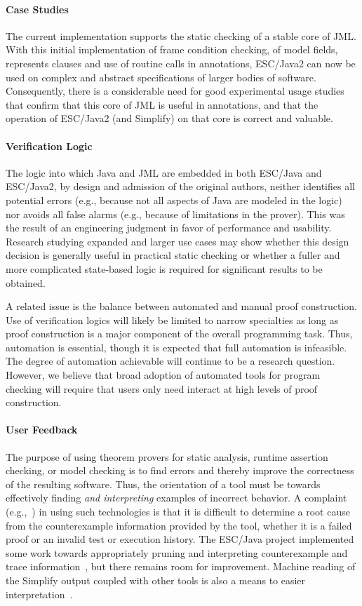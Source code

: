 \documentclass{llncs}
\begin{document}
\paragraph*{Case Studies} The current implementation supports the
static checking of a stable core of JML.  With this initial
implementation of frame condition checking, of model fields,
represents clauses and use of routine calls in annotations, ESC/Java2
can now be used on complex and abstract specifications of larger
bodies of software.  Consequently, there is a considerable need for
good experimental usage studies that confirm that this core of JML is
useful in annotations, and that the operation of ESC/Java2 (and
Simplify) on that core is correct and valuable.

\paragraph*{Verification Logic} The logic into which Java and JML are
embedded in both ESC/Java and ESC/Java2, by design and admission of
the original authors, neither identifies all potential errors (e.g.,
because not all aspects of Java are modeled in the logic) nor avoids
all false alarms (e.g., because of limitations in the prover).  This
was the result of an engineering judgment in favor of performance and
usability.  Research studying expanded and larger use cases may show
whether this design decision is generally useful in practical static
checking or whether a fuller and more complicated state-based logic is
required for significant results to be obtained.

A related issue is the balance between automated and manual proof
construction.  Use of verification logics will likely be limited to
narrow specialties as long as proof construction is a major component
of the overall programming task.  Thus, automation is essential,
though it is expected that full automation is infeasible.  The degree
of automation achievable will continue to be a research question.
However, we believe that broad adoption of automated tools for program
checking will require that users only need interact at high levels of
proof construction.

\paragraph*{User Feedback} The purpose of using theorem provers for
static analysis, runtime assertion checking, or model checking is to
find errors and thereby improve the correctness of the resulting
software.  Thus, the orientation of a tool must be towards effectively
finding \emph{and interpreting} examples of incorrect behavior.  A
complaint (e.g.,~\cite{GroceVisser03}) in using such technologies is
that it is difficult to determine a root cause from the counterexample
information provided by the tool, whether it is a failed proof or an
invalid test or execution history.  The ESC/Java project implemented
some work towards appropriately pruning and interpreting
counterexample and trace
information~\cite{LeinoMillsteinSaxe:ErrorTraces}, but there remains
room for improvement.  Machine reading of the Simplify output coupled
with other tools is also a means to easier
interpretation~\cite{csallner05check}.
\end{document}
